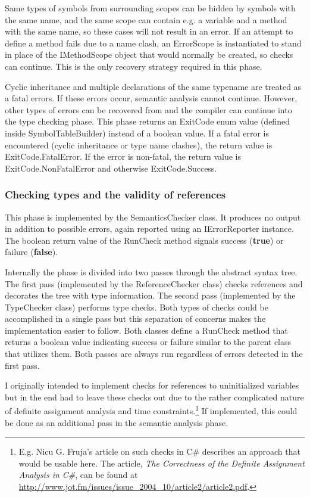 \documentclass[a4paper,11pt]{article}
\begin{document}
Same types of symbols from surrounding scopes can be hidden by symbols with the same name, and the same scope can contain e.g. a variable and a method with the same name, so these cases will not result in an error. If an attempt to define a method fails due to a name clash, an ErrorScope is instantiated to stand in place of the IMethodScope object that would normally be created, so checks can continue. This is the only recovery strategy required in this phase.

Cyclic inheritance and multiple declarations of the same typename are treated as a fatal errors. If these errors occur, semantic analysis cannot continue. However, other types of errors can be recovered from and the compiler can continue into the type checking phase. This phase returns an ExitCode enum value (defined inside SymbolTableBuilder) instead of a boolean value. If a fatal error is encountered (cyclic inheritance or type name clashes), the return value is ExitCode.FatalError. If the error is non-fatal, the return value is ExitCode.NonFatalError and otherwise ExitCode.Success.

\subsubsection{Checking types and the validity of references}

This phase is implemented by the SemanticsChecker class. It produces no output in addition to possible errors, again reported using an IErrorReporter instance. The boolean return value of the RunCheck method signals success (\textbf{true}) or failure (\textbf{false}).

Internally the phase is divided into two passes through the abstract syntax tree. The first pass (implemented by the ReferenceChecker class) checks references and decorates the tree with type information. The second pass (implemented by the TypeChecker class) performs type checks. Both types of checks could be accomplished in a single pass but this separation of concerns makes the implementation easier to follow. Both classes define a RunCheck method that returns a boolean value indicating success or failure similar to the parent class that utilizes them. Both passes are always run regardless of errors detected in the first pass.

I originally intended to implement checks for references to uninitialized variables but in the end had to leave these checks out due to the rather complicated nature of definite assignment analysis and time constraints.\footnote{E.g. Nicu G. Fruja's article on such checks in C\# describes an approach that would be usable here. The article, \emph{The Correctness of the Definite Assignment Analysis in C\#}, can be found at \url{http://www.jot.fm/issues/issue_2004_10/article2/article2.pdf}.} If implemented, this could be done as an additional pass in the semantic analysis phase.
\end{document}
